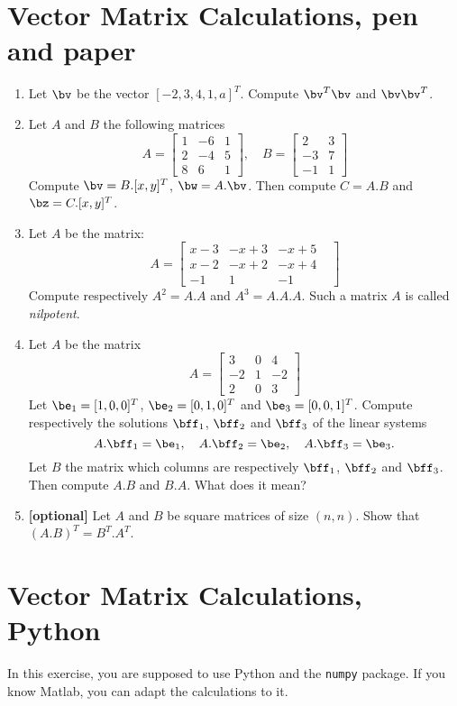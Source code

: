 \documentclass[a4paper,10pt]{article}
\begin{document}
\section{Vector Matrix Calculations, pen and paper}
\begin{enumerate}
  \item Let $\bv$ be the vector $[-2,3,4,1,a]^T$. Compute $\bv^T\bv$ and $\bv\bv^T$.
  \item Let $A$ and $B$ the following matrices
  $$
  A = \begin{bmatrix}
    1 & -6 & 1\\
    2 & -4 & 5\\
    8 & 6 & 1
  \end{bmatrix},
  \quad
  B = \begin{bmatrix}
    2 & 3\\ -3 & 7\\ -1 &1
  \end{bmatrix}
  $$
  Compute $\bv = B.[x,y]^T$, $\bw = A.\bv$. Then compute $C = A.B$ and $\bz = C.[x,y]^T$.
  \item Let $A$ be the matrix:
  $$
  A = \begin{bmatrix}
  x-3&  -x+3&  -x+5\\
  x-2&  -x+2&  -x+4&\\
   -1&   1&   -1&
   \end{bmatrix}
  $$
  Compute respectively $A^2 = A.A$ and $A^3 = A.A.A$. Such a matrix $A$ is called \emph{nilpotent}.
  \item Let $A$ be the matrix
  $$
  A = \begin{bmatrix}
    3 & 0 & 4\\
    -2 & 1 & -2\\
    2 & 0 & 3 
  \end{bmatrix}
  $$
  Let $\be_1 = [1,0,0]^T$, $\be_2 = [0,1,0]^T$ and $\be_3=[0,0,1]^T$.
  Compute respectively the solutions $\bff_1$, $\bff_2$ and $\bff_3$ of the linear systems 
  $$
  A.\bff_1 = \be_1,\quad A.\bff_2 = \be_2,\quad A.\bff_3 = \be_3.
  $$
  Let $B$ the matrix which columns are respectively $\bff_1$, $\bff_2$ and $\bff_3$. Then compute $A.B$ and $B.A$. What does it mean?
  \item {\bf[optional]} Let $A$ and $B$ be square matrices of size $(n,n)$. Show that $(A.B)^T = B^T.A^T$.
\end{enumerate}


\section{Vector Matrix Calculations, Python}
In this exercise, you are supposed to use Python and the \texttt{numpy} package. If you know Matlab, you can adapt the calculations to it.
\end{document}
